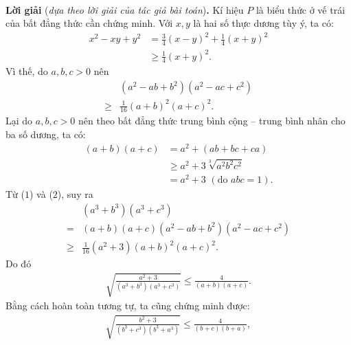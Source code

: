 \begin{multicols}{2}
\begin{align*}
	\end{align*}
	\textbf{\color{thachthuctoanhoc}Lời giải} (\textit{dựa theo lời giải của tác giả bài toán})\textbf{\color{thachthuctoanhoc}.}
	\vskip 0.05cm
	Kí hiệu $P$ là biểu thức ở vế trái của bất đẳng thức cần chứng minh.
	\vskip 0.05cm
	Với $x, y$ là hai số thực dương tùy ý, ta có:
	\begin{align*}
		{x^2} - xy + {y^2} &= \frac{3}{4}{(x - y)^2} + \frac{1}{4}{(x + y)^2}\\ &\ge \frac{1}{4}{(x + y)^2}.
	\end{align*}
	Vì thế, do $a, b, c > 0$ nên
	\begin{align*}
		&\left( {{a^2} - ab + {b^2}} \right)\left( {{a^2} - ac + {c^2}} \right)\\ 
		\ge &\frac{1}{{16}}{\left( {a + b} \right)^2}{\left( {a + c} \right)^2}. \tag{$1$}
	\end{align*}
	Lại do $a, b, c > 0$ nên theo bất đẳng thức trung bình cộng -- trung bình nhân cho ba số dương, ta có:
	\begin{align*}
		\left( {a + b} \right)\left( {a + c} \right) &= {a^2} + \left( {ab + bc + ca} \right) \\
		&\ge {a^2} + 3\sqrt[3]{{{a^2}{b^2}{c^2}}} \\
		&= {a^2} + 3 \,\,({\text{do }}abc = 1).
	\end{align*}
	Từ ($1$) và ($2$), suy ra
	\begin{align*}
		&\left( {{a^3} + {b^3}} \right)\left( {{a^3} + {c^3}} \right) \\
		= &\left( {a \!+\! b} \right)\!\left( {a \!+\! c} \right)\left( {{a^2} \!-\! ab \!+\! {b^2}} \right)\!\left( {{a^2} \!-\! ac \!+\! {c^2}} \right) \\
		\ge &\frac{1}{{16}}\left( {{a^2} + 3} \right){\left( {a + b} \right)^2}{\left( {a + c} \right)^2}.
	\end{align*}
	Do đó
	\begin{align*}
		\sqrt {\!\!\frac{{{a^2} \!+\! 3}}{{\left( {{a^3} \!+\! {b^3}} \right)\!\left( {{a^3} \!+\! {c^3}} \right)}}}  \!\le\! \frac{4}{{\left( {a \!+\! b} \right)\!\left( {a \!+\! c} \right)}}. \tag{$3$}
	\end{align*}
	Bằng cách hoàn toàn tương tự, ta cũng chứng minh được:
	\begin{align*}
		\sqrt {\!\!\frac{{{b^2} \!+\! 3}}{{\left( {{b^3} \!+\! {c^3}} \right)\!\left( {{b^3} \!+\! {a^3}} \right)}}}  \!\le\! \frac{4}{{\left( {b \!+\! c} \right)\!\left( {b \!+\! a} \right)}}, \tag{$4$}\\

\end{align*}
\end{multicols}

